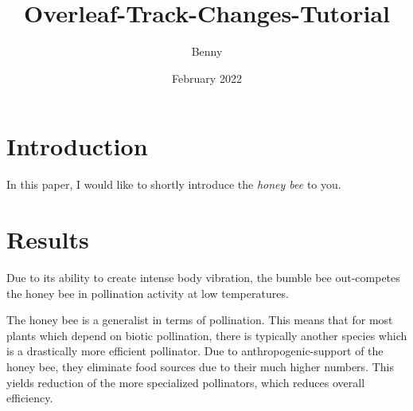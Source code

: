 \documentclass{article}
\title{Overleaf-Track-Changes-Tutorial}
\author{Benny}
\date{February 2022}
\begin{document}
\maketitle

\section{Introduction}

In this paper, I would like to shortly introduce the \textit{honey bee} to you.

\section{Results}

Due to its ability to create intense body vibration, the bumble bee out-competes the honey bee in pollination activity at low temperatures.

The honey bee is a generalist in terms of pollination. This means that for most plants which depend on biotic pollination, there is typically another species which is a drastically more efficient pollinator. Due to anthropogenic-support of the honey bee, they eliminate food sources due to their much higher numbers. This yields reduction of the more specialized pollinators, which reduces overall efficiency.
\end{document}
